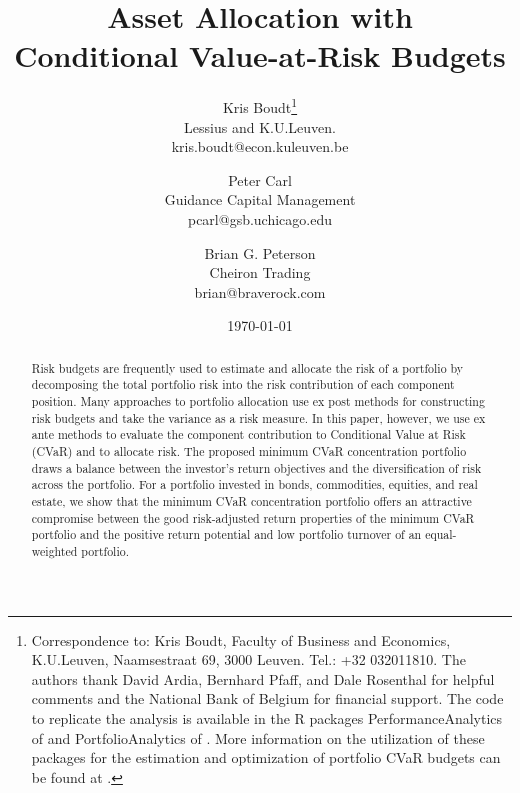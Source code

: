 \documentclass[12pt,a4paper]{article}
\renewcommand{\baselinestretch}{1.3}
\begin{document}
\vspace{-2cm}
\renewcommand{\baselinestretch}{1}
\title{Asset Allocation with \\ Conditional Value-at-Risk Budgets}

\smallskip

\author{
Kris Boudt\thanks{Correspondence to: Kris Boudt,
Faculty of Business and Economics, K.U.Leuven, Naamsestraat 69, 3000 Leuven. Tel.: +32 032011810. The authors thank David Ardia, Bernhard Pfaff, and Dale Rosenthal for helpful comments and the National Bank of Belgium for financial support. The code to replicate the analysis is available in the R packages PerformanceAnalytics of \citet{PerformanceAnalytics} and PortfolioAnalytics of \citet{PortfolioAnalytics}. More information on the utilization of these packages for the estimation and optimization of portfolio CVaR budgets can be found at \web.}\\
Lessius and K.U.Leuven.\\
kris.boudt@econ.kuleuven.be
 \and Peter Carl\\
Guidance Capital Management  \\
pcarl@gsb.uchicago.edu\\
\and Brian G. Peterson\\
Cheiron Trading\\
brian@braverock.com}

\date{\today}

\maketitle
\thispagestyle{empty} %

\vspace{-0.5cm}

\renewcommand{\baselinestretch}{1}
\begin{abstract}
Risk budgets are frequently used to estimate and allocate the risk of a portfolio by decomposing the total portfolio risk into the risk contribution of each component position. Many approaches to portfolio allocation use ex post methods for constructing risk budgets and take the variance as a risk measure. In this paper, however, we use ex ante methods to evaluate the component contribution to Conditional Value at Risk (CVaR) and to allocate risk. The proposed minimum CVaR concentration portfolio draws a balance between the investor's return objectives and the diversification of risk across the portfolio. For a portfolio invested in bonds, commodities, equities, and real estate, we show that the minimum CVaR concentration portfolio offers an attractive compromise between the good risk-adjusted return properties of the minimum CVaR portfolio and the positive return potential and low portfolio turnover of an equal-weighted portfolio.
\end{abstract}
\end{document}
